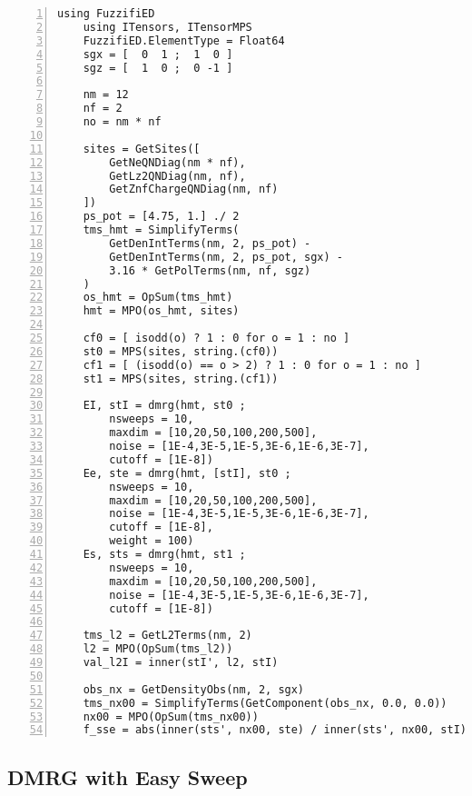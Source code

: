 \documentclass{timesjhep}
\begin{document}
\begin{lstlisting}[numbers=left]
    using FuzzifiED
    using ITensors, ITensorMPS
    FuzzifiED.ElementType = Float64
    sgx = [  0  1 ;  1  0 ]
    sgz = [  1  0 ;  0 -1 ]

    nm = 12
    nf = 2
    no = nm * nf

    sites = GetSites([
        GetNeQNDiag(nm * nf), 
        GetLz2QNDiag(nm, nf),
        GetZnfChargeQNDiag(nm, nf)
    ])
    ps_pot = [4.75, 1.] ./ 2
    tms_hmt = SimplifyTerms(
        GetDenIntTerms(nm, 2, ps_pot) - 
        GetDenIntTerms(nm, 2, ps_pot, sgx) - 
        3.16 * GetPolTerms(nm, nf, sgz)
    )
    os_hmt = OpSum(tms_hmt)
    hmt = MPO(os_hmt, sites)

    cf0 = [ isodd(o) ? 1 : 0 for o = 1 : no ]
    st0 = MPS(sites, string.(cf0))
    cf1 = [ (isodd(o) == o > 2) ? 1 : 0 for o = 1 : no ]
    st1 = MPS(sites, string.(cf1))

    EI, stI = dmrg(hmt, st0 ; 
        nsweeps = 10, 
        maxdim = [10,20,50,100,200,500], 
        noise = [1E-4,3E-5,1E-5,3E-6,1E-6,3E-7], 
        cutoff = [1E-8])
    Ee, ste = dmrg(hmt, [stI], st0 ; 
        nsweeps = 10, 
        maxdim = [10,20,50,100,200,500], 
        noise = [1E-4,3E-5,1E-5,3E-6,1E-6,3E-7], 
        cutoff = [1E-8], 
        weight = 100)
    Es, sts = dmrg(hmt, st1 ; 
        nsweeps = 10, 
        maxdim = [10,20,50,100,200,500], 
        noise = [1E-4,3E-5,1E-5,3E-6,1E-6,3E-7], 
        cutoff = [1E-8])
    
    tms_l2 = GetL2Terms(nm, 2)
    l2 = MPO(OpSum(tms_l2))
    val_l2I = inner(stI', l2, stI)
    
    obs_nx = GetDensityObs(nm, 2, sgx)
    tms_nx00 = SimplifyTerms(GetComponent(obs_nx, 0.0, 0.0))
    nx00 = MPO(OpSum(tms_nx00))
    f_sse = abs(inner(sts', nx00, ste) / inner(sts', nx00, stI))
\end{lstlisting}

\subsection{DMRG with Easy Sweep}
\end{document}
